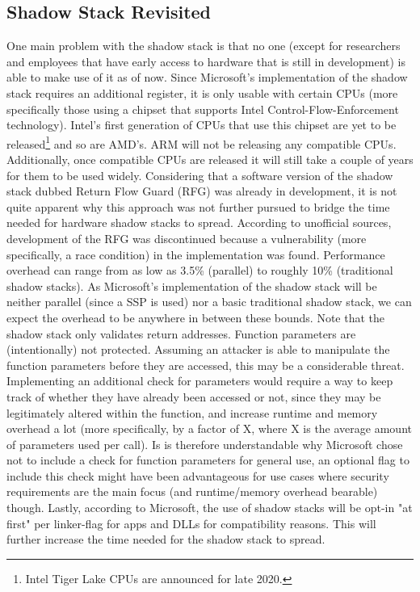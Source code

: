 \documentclass[10pt,twocolumn,a4paper]{article}
\begin{document}
\subsection{Shadow Stack Revisited}
One main problem with the shadow stack is that no one (except for researchers and employees that have early access to hardware that is still in development) is able to make use of it as of now. Since Microsoft's implementation of the shadow stack requires an additional register, it is only usable with certain CPUs (more specifically those using a chipset that supports Intel Control-Flow-Enforcement technology)\cite{CFE}.
Intel's first generation of CPUs that use this chipset are yet to be released\footnote{Intel Tiger Lake CPUs are announced for late 2020.} and so are AMD's.
\newline ARM will not be releasing any compatible CPUs\cite{techrepublic}.
Additionally, once compatible CPUs are released it will still take a couple of years for them to be used widely.
Considering that a software version of the shadow stack dubbed Return Flow Guard (RFG)\cite{RFG} was already in development, it is not quite apparent why this approach was not further pursued to bridge the time needed for hardware shadow stacks to spread.
According to unofficial sources, development of the RFG was discontinued because a vulnerability (more specifically, a race condition) in the implementation was found\cite{techrepublic}.
Performance overhead can range from as low as 3.5\% (parallel) to roughly 10\% (traditional shadow stacks)\cite{performance}. As Microsoft's implementation of the shadow stack will be neither parallel (since a SSP is used) nor a basic traditional shadow stack, we can expect the overhead to be anywhere in between these bounds.
Note that the shadow stack only validates return addresses. Function parameters are (intentionally) not protected\cite{SS}.
Assuming an attacker is able to manipulate the function parameters before they are accessed, this may be a considerable threat. Implementing an additional check for parameters would require a way to keep track of whether they have already been accessed or not, since they may be legitimately altered within the function, and increase runtime and memory overhead a lot (more specifically, by a factor of X, where X is the average amount of parameters used per call).
Is is therefore understandable why Microsoft chose not to include a check for function parameters for general use, an optional flag to include this check might have been advantageous for use cases where security requirements are the main focus (and runtime/memory overhead bearable) though.
Lastly, according to Microsoft, the use of shadow stacks will be opt-in "at first" per linker-flag for apps and DLLs for compatibility reasons\cite{SS}. This will further increase the time needed for the shadow stack to spread.
\end{document}
